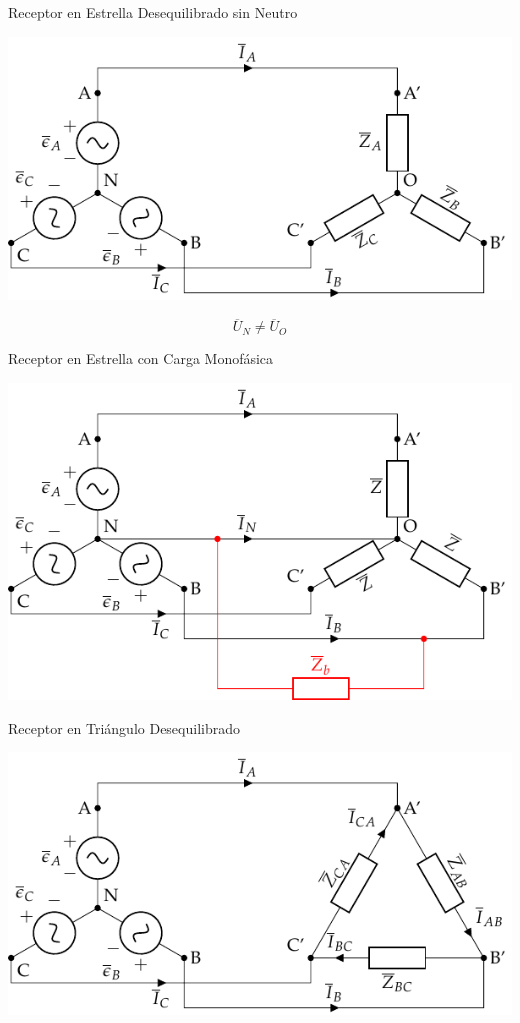 \documentclass[aspectratio=169, usenames,svgnames,dvipsnames]{beamer}
\begin{document}
\begin{frame}[label={sec:org8edb0e2}]{Receptor en Estrella Desequilibrado sin Neutro}
\begin{center}
\includegraphics[width=.9\linewidth]{../figs/EstrellaDesequilibrado_SinNeutro.pdf}
\end{center}

\[
\overline{U}_N \neq \overline{U}_{O}
\]
\end{frame}
\begin{frame}[label={sec:org7c23148}]{Receptor en Estrella con Carga Monofásica}
\begin{center}
\includegraphics[height=0.9\textheight]{../figs/Estrella_CargaMonofasica.pdf}
\end{center}
\end{frame}
\begin{frame}[label={sec:org32aae40}]{Receptor en Triángulo Desequilibrado}
\begin{center}
\includegraphics[height=0.9\textheight]{../figs/TrianguloDesequilibrado.pdf}
\end{center}
\end{frame}
\end{document}
